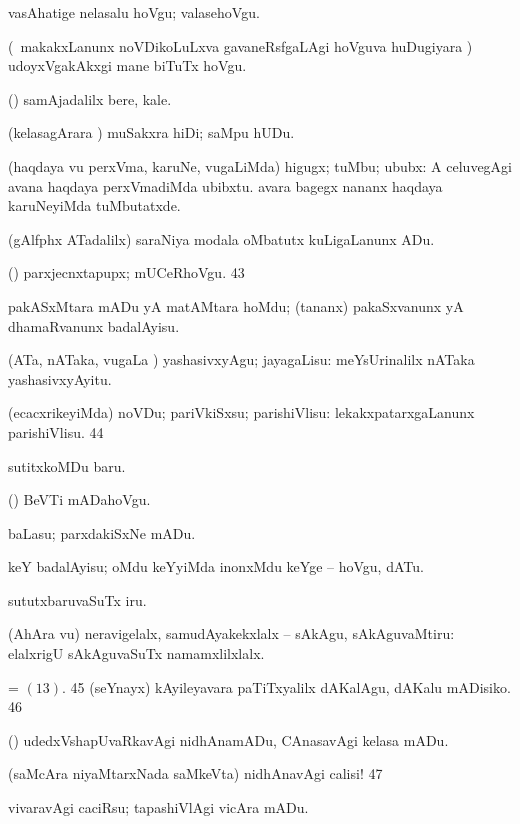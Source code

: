 {{ vasAhatige nelasalu
hoVgu; valasehoVgu. 

 (\sA\ makakxLanunx noVDikoLuLxva gavaneRsfgaLAgi
hoVguva huDugiyara \vi) udoyxVgakAkxgi mane biTuTx hoVgu. 

 (\AmA)
samAjadalilx bere, kale. 

 (kelasagArara \vi) muSakxra hiDi; saMpu hUDu.

 (haqdaya \mo vu perxVma, karuNe, \mo vugaLiMda) higugx; tuMbu; ububx:
 A celuvegAgi avana haqdaya perxVmadiMda ubibxtu.  avara bagegx nananx haqdaya
karuNeyiMda tuMbutatxde. 

 (gAlfphx ATadalilx) saraNiya modala oMbatutx
kuLigaLanunx ADu. 

 (\AmA) parxjecnxtapupx; mUCeRhoVgu. 
\num{43}  

 pakASxMtara mADu yA matAMtara hoMdu; (tananx) pakaSxvanunx yA
dhamaRvanunx badalAyisu. 

 (ATa, nATaka, \mo vugaLa \vi) yashasivxyAgu;
jayagaLisu:  meYsUrinalilx nATaka yashasivxyAyitu. 

 (ecacxrikeyiMda) noVDu; pariVkiSxsu; parishiVlisu:  lekakxpatarxgaLanunx parishiVlisu. 
\num{44} 

 sutitxkoMDu baru. 

 (\AmA) BeVTi mADahoVgu. 

 baLasu; parxdakiSxNe mADu. 

 keY badalAyisu; oMdu keYyiMda inonxMdu keYge -- hoVgu, dATu. 

 sututxbaruvaSuTx iru. 

 (AhAra \mo vu) neravigelalx, samudAyakekxlalx -- sAkAgu,
sAkAguvaMtiru:  elalxrigU
sAkAguvaSuTx namamxlilxlalx.  

 = \hyperlink{go pagu13}{\pagu $(13)$}. 
\num{45}  (seYnayx) kAyileyavara paTiTxyalilx dAKalAgu, dAKalu mADisiko. 
\num{46}  

 (\kanmu) udedxVshapUvaRkavAgi nidhAnamADu, CAnasavAgi kelasa mADu. 

 (saMcAra niyaMtarxNada saMkeVta) nidhAnavAgi calisi! 
\num{47} 

 vivaravAgi caciRsu; tapashiVlAgi vicAra mADu. 

}}
